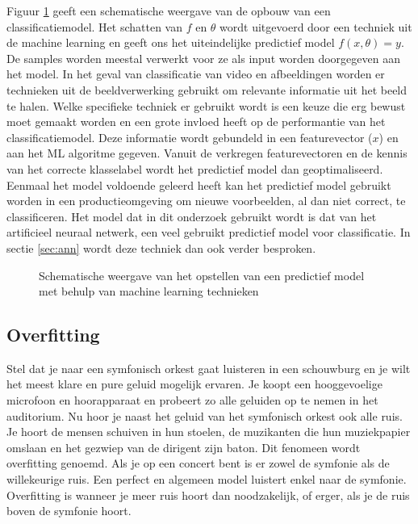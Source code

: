 \npar Figuur \ref{fig:alg-class-model} geeft een schematische weergave van de opbouw van een classificatiemodel. Het schatten van $f$ en $\theta$ wordt uitgevoerd door een techniek uit de machine learning en geeft ons het uiteindelijke predictief model $f(x,\theta) = y$. De samples worden meestal verwerkt voor ze als input worden doorgegeven aan het model. In het geval van classificatie van video en afbeeldingen worden er technieken uit de beeldverwerking gebruikt om relevante informatie uit het beeld te halen. Welke specifieke techniek er gebruikt wordt is een keuze die erg bewust moet gemaakt worden en een grote invloed heeft op de performantie van het classificatiemodel. Deze informatie wordt gebundeld in een featurevector ($x$) en aan het ML algoritme gegeven. Vanuit de verkregen featurevectoren en de kennis van het correcte klasselabel wordt het predictief model dan geoptimaliseerd.
\npar Eenmaal het model voldoende geleerd heeft kan het predictief model gebruikt worden in een productieomgeving om nieuwe voorbeelden, al dan niet correct, te classificeren.
\npar Het model dat in dit onderzoek gebruikt wordt is dat van het artificieel neuraal netwerk, een veel gebruikt predictief model voor classificatie. In sectie \ref{sec:ann} wordt deze techniek dan ook verder besproken.
\begin{figure}
	\centering
	\def\svgscale{0.85}
	
	\caption{Schematische weergave van het opstellen van een predictief model met behulp van machine learning technieken \label{fig:alg-class-model}}
\end{figure}

\subsection{Overfitting}
\npar Stel dat je naar een symfonisch orkest gaat luisteren in een schouwburg en je wilt het meest klare en pure geluid mogelijk ervaren. Je koopt een hooggevoelige microfoon en hoorapparaat en probeert zo alle geluiden op te nemen in het auditorium. Nu hoor je naast het geluid van het symfonisch orkest ook alle ruis. Je hoort de mensen schuiven in hun stoelen, de muzikanten die hun muziekpapier omslaan en het gezwiep van de dirigent zijn baton. Dit fenomeen wordt overfitting genoemd. Als je op een concert bent is er zowel de symfonie als de willekeurige ruis. Een perfect en algemeen model luistert enkel naar de symfonie. Overfitting is wanneer je meer ruis hoort dan noodzakelijk, of erger, als je de ruis boven de symfonie hoort.

